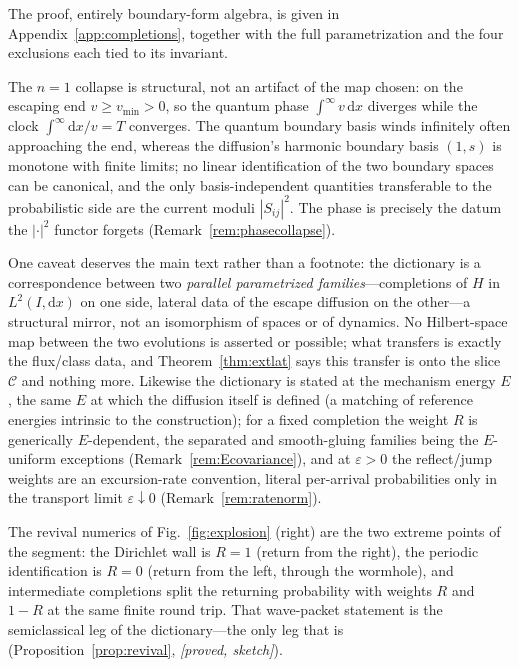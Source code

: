 \documentclass[11pt]{article}
\theoremstyle{definition}
\theoremstyle{remark}
\newcommand{\dd}{\mathrm{d}}
\begin{document}
The proof, entirely boundary-form algebra, is given in
Appendix~\ref{app:completions}, together with the full parametrization
and the four exclusions each tied to its invariant.

The $n=1$ collapse is structural, not an artifact of the map chosen: on
the escaping end $v\ge v_{\min}>0$, so the quantum phase
$\int^{\infty}v\,\dd x$ diverges while the clock
$\int^{\infty}\dd x/v=T$ converges. The quantum boundary basis winds
infinitely often approaching the end, whereas the diffusion's harmonic
boundary basis $(1,s)$ is monotone with finite limits; no linear
identification of the two boundary spaces can be canonical, and the only
basis-independent quantities transferable to the probabilistic side are
the current moduli $|S_{ij}|^{2}$. The phase is precisely the datum the
$|\cdot|^{2}$ functor forgets (Remark~\ref{rem:phasecollapse}).

One caveat deserves the main text rather than a footnote: the dictionary
is a correspondence between two \emph{parallel parametrized
families}---completions of $H$ in $L^{2}(I,\dd x)$ on one side, lateral
data of the escape diffusion on the other---a structural mirror, not an
isomorphism of spaces or of dynamics. No Hilbert-space map between the
two evolutions is asserted or possible; what transfers is exactly the
flux/class data, and Theorem~\ref{thm:extlat} says this transfer is onto
the slice $\mathcal C$ and nothing more. Likewise the dictionary is
stated at the mechanism energy $E$, the same $E$ at which the diffusion
itself is defined (a matching of reference energies intrinsic to the
construction); for a fixed completion the weight $R$ is generically
$E$-dependent, the separated and smooth-gluing families being the
$E$-uniform exceptions (Remark~\ref{rem:Ecovariance}), and at
$\varepsilon>0$ the reflect/jump weights are an excursion-rate
convention, literal per-arrival probabilities only in the transport
limit $\varepsilon\downarrow0$ (Remark~\ref{rem:ratenorm}).

The revival numerics of Fig.~\ref{fig:explosion} (right) are the two
extreme points of the segment: the Dirichlet wall is $R=1$ (return from
the right), the periodic identification is $R=0$ (return from the left,
through the wormhole), and intermediate completions split the returning
probability with weights $R$ and $1-R$ at the same finite round trip.
That wave-packet statement is the semiclassical leg of the
dictionary---the only leg that is
(Proposition~\ref{prop:revival}, \emph{[proved, sketch]}).
\end{document}

